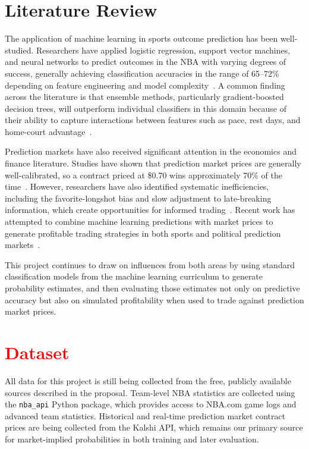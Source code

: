 \documentclass[sigconf]{acmart}
\begin{document}
\section{Literature Review}
The application of machine learning in sports outcome prediction has been well-studied. Researchers have applied logistic regression, support vector machines, and neural networks to predict outcomes in the NBA with varying degrees of success, generally achieving classification accuracies in the range of 65--72\% depending on feature engineering and model complexity~\cite{thabtah2019, loeffelholz2009}. A common finding across the literature is that ensemble methods, particularly gradient-boosted decision trees, will outperform individual classifiers in this domain because of their ability to capture interactions between features such as pace, rest days, and home-court advantage~\cite{chen2016xgboost}.

Prediction markets have also received significant attention in the economics and finance literature. Studies have shown that prediction market prices are generally well-calibrated, so a contract priced at \$0.70 wins approximately 70\% of the time~\cite{wolfers2004}. However, researchers have also identified systematic inefficiencies, including the favorite-longshot bias and slow adjustment to late-breaking information, which create opportunities for informed trading~\cite{snowberg2010}. Recent work has attempted to combine machine learning predictions with market prices to generate profitable trading strategies in both sports and political prediction markets~\cite{beal2021}.

This project continues to draw on influences from both areas by using standard classification models from the machine learning curriculum to generate probability estimates, and then evaluating those estimates not only on predictive accuracy but also on simulated profitability when used to trade against prediction market prices.

\section{\textcolor{red}{Dataset}}
All data for this project is still being collected from the free, publicly available sources described in the proposal. Team-level NBA statistics are collected using the \texttt{nba\_api} Python package, which provides access to NBA.com game logs and advanced team statistics. Historical and real-time prediction market contract prices are being collected from the Kalshi API, which remains our primary source for market-implied probabilities in both training and later evaluation.
\end{document}
